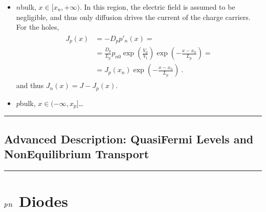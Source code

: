 \documentclass[letterpaper,10pt,english]{jupyterBook}
\begin{document}
\begin{itemize}
\item {} 
\sphinxAtStartPar
\(n\)\sphinxhyphen{}bulk, \(x \in [ x_n, +\infty)\). In this region, the electric field is assumed to be negligible, and thus only diffusion drives the current of the charge carriers. For the holes,
\begin{equation*}
\begin{split}\begin{aligned}
     J_p(x) 
     & = - D_p p'_n(x) = \\
     & = \frac{D_p}{L_p} p_{n0} \exp\left( \frac{V_a}{V_t} \right) \exp \left( - \frac{x-x_n}{L_p} \right) = \\
     & = J_p(x_n) \exp \left( - \frac{x-x_n}{L_p} \right)  \ .
   \end{aligned}\end{split}
\end{equation*}
\sphinxAtStartPar
and thus \(J_n(x) = J - J_p(x)\).

\item {} 
\sphinxAtStartPar
\(p\)\sphinxhyphen{}bulk, \(x \in (-\infty, x_p]\)…

\end{itemize}


\bigskip\hrule\bigskip





\subsection{Advanced Description: Quasi\sphinxhyphen{}Fermi Levels and Non\sphinxhyphen{}Equilibrium Transport}
\label{\detokenize{ch/solid-state/semiconductors-pn-junctions:advanced-description-quasi-fermi-levels-and-non-equilibrium-transport}}
\sphinxAtStartPar
{} 




\bigskip\hrule\bigskip


\sphinxstepscope


\section{\protect\(p\protect\)\sphinxhyphen{}\protect\(n\protect\) Diodes}
\label{\detokenize{ch/solid-state/semiconductors-pn-diodes:p-n-diodes}}\label{\detokenize{ch/solid-state/semiconductors-pn-diodes:semiconductors-pn-diodes}}\label{\detokenize{ch/solid-state/semiconductors-pn-diodes::doc}}
\end{document}
